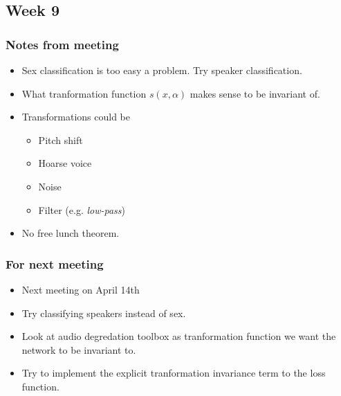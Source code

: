 
\subsection{Week 9}

\subsubsection{Notes from meeting}

\begin{itemize}
\item Sex classification is too easy a problem. Try speaker classification.
\item What tranformation function $s(x, \alpha)$ makes sense to be invariant of.
\item Transformations could be
\begin{itemize}
  \item Pitch shift
  \item Hoarse voice
  \item Noise
  \item Filter (e.g. \textit{low-pass})
\end{itemize}
\item No free lunch theorem.
\end{itemize}

\subsubsection{For next meeting}

\begin{itemize}
\item Next meeting on April 14th
\item Try classifying speakers instead of sex.
\item Look at audio degredation toolbox as tranformation function we want the network to be invariant to.
\item Try to implement the explicit tranformation invariance term to the loss function.
\end{itemize}
